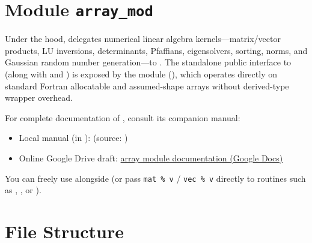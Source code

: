 
\section{Module \texttt{array\_mod}}
\label{sec:module_array}

Under the hood,  delegates numerical linear algebra kernels---matrix/vector products, LU inversions, determinants, Pfaffians, eigensolvers, sorting, norms, and Gaussian random number generation---to . The standalone public interface to  (along with  and ) is exposed by the  module (), which operates directly on standard Fortran allocatable and assumed-shape arrays without derived-type wrapper overhead.

For complete documentation of , consult its companion manual:
\begin{itemize}
  \item Local manual (in ):  (source: )
  \item Online Google Drive draft: \href{https://docs.google.com/document/d/19KoFFvpxTcm9FN1zGqdGaBopyJhl2vYA0D1mEHbTUZ8/edit?usp=sharing}{array module documentation (Google Docs)}
\end{itemize}
You can freely use  alongside  (or pass \texttt{mat \% v} / \texttt{vec \% v} directly to  routines such as , , or ).

\section{File Structure}
\label{sec:file_structure}

